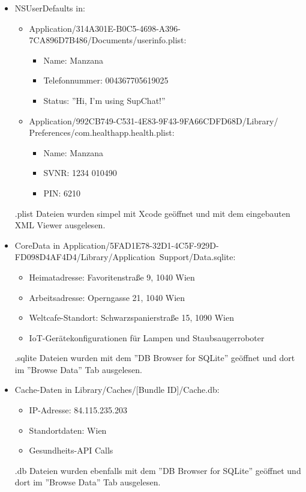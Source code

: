 \documentclass[12pt,a4paper,titlepage,oneside]{scrartcl}
\begin{document}
\begin{itemize}
\item NSUserDefaults in:
  \begin{itemize}
  \item Application/314A301E-B0C5-4698-A396-7CA896D7B486/Documents/userinfo.plist:
    \begin{itemize}
    \item Name: Manzana
    \item Telefonnummer: 004367705619025
    \item Status: ''Hi, I'm using SupChat!''
    \end{itemize}
  \item Application/992CB749-C531-4E83-9F43-9FA66CDFD68D/Library/ Preferences/com.healthapp.health.plist:
    \begin{itemize}
    \item Name: Manzana
    \item SVNR: 1234 010490
    \item PIN: 6210
    \end{itemize}
  \end{itemize}
  .plist Dateien wurden simpel mit Xcode geöffnet und mit dem eingebauten XML Viewer ausgelesen.

\item CoreData in Application/5FAD1E78-32D1-4C5F-929D-FD098D4AF4D4/Library/Application\ Support/Data.sqlite:
  \begin{itemize}
  \item Heimatadresse: Favoritenstraße 9, 1040 Wien
  \item Arbeitsadresse: Operngasse 21, 1040 Wien
  \item Weltcafe-Standort: Schwarzspanierstraße 15, 1090 Wien
  \item IoT-Gerätekonfigurationen für Lampen und Staubsaugerroboter
  \end{itemize}

  .sqlite Dateien wurden mit dem ''DB Browser for SQLite'' geöffnet und dort im ''Browse Data'' Tab ausgelesen.
\item Cache-Daten in Library/Caches/[Bundle ID]/Cache.db:
  \begin{itemize}
  \item IP-Adresse: 84.115.235.203
  \item Standortdaten: Wien
  \item Gesundheits-API Calls
  \end{itemize}

  .db Dateien wurden ebenfalls mit dem ''DB Browser for SQLite'' geöffnet und dort im ''Browse Data'' Tab ausgelesen.


\end{itemize}
\end{document}
